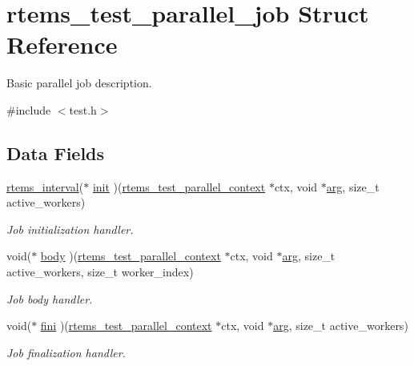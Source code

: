 \hypertarget{structrtems__test__parallel__job}{}\section{rtems\+\_\+test\+\_\+parallel\+\_\+job Struct Reference}
\label{structrtems__test__parallel__job}


Basic parallel job description.  




{\ttfamily \#include $<$test.\+h$>$}

\subsection*{Data Fields}
\begin{DoxyCompactItemize}
\item 
\mbox{\hyperlink{group__ClassicTasks_gad39c43f949683d46874e3a5586b93aee}{rtems\+\_\+interval}}($\ast$ \mbox{\hyperlink{structrtems__test__parallel__job_a0640b0509f506cf8e7d2d597975be45b}{init}} )(\mbox{\hyperlink{structrtems__test__parallel__context}{rtems\+\_\+test\+\_\+parallel\+\_\+context}} $\ast$ctx, void $\ast$\mbox{\hyperlink{structrtems__test__parallel__job_a52ddd602bb812999b845a10b44c32954}{arg}}, size\+\_\+t active\+\_\+workers)
\begin{DoxyCompactList}\small\item\em Job initialization handler. \end{DoxyCompactList}\item 
void($\ast$ \mbox{\hyperlink{structrtems__test__parallel__job_aa0e1e25be6484e3995243907de9bdba8}{body}} )(\mbox{\hyperlink{structrtems__test__parallel__context}{rtems\+\_\+test\+\_\+parallel\+\_\+context}} $\ast$ctx, void $\ast$\mbox{\hyperlink{structrtems__test__parallel__job_a52ddd602bb812999b845a10b44c32954}{arg}}, size\+\_\+t active\+\_\+workers, size\+\_\+t worker\+\_\+index)
\begin{DoxyCompactList}\small\item\em Job body handler. \end{DoxyCompactList}\item 
void($\ast$ \mbox{\hyperlink{structrtems__test__parallel__job_ab03e128980326bb30db0f5a457613010}{fini}} )(\mbox{\hyperlink{structrtems__test__parallel__context}{rtems\+\_\+test\+\_\+parallel\+\_\+context}} $\ast$ctx, void $\ast$\mbox{\hyperlink{structrtems__test__parallel__job_a52ddd602bb812999b845a10b44c32954}{arg}}, size\+\_\+t active\+\_\+workers)
\begin{DoxyCompactList}\small\item\em Job finalization handler. \end{DoxyCompactList}\item 

\end{DoxyCompactItemize}
